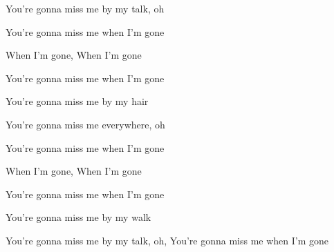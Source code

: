 You're gonna miss me by my talk, oh

You're gonna miss me when I'm gone

When I'm gone, When I'm gone

You're gonna miss me when I'm gone

You're gonna miss me by my hair

You're gonna miss me everywhere, oh

You're gonna miss me when I'm gone

When I'm gone, When I'm gone

You're gonna miss me when I'm gone

You're gonna miss me by my walk

You're gonna miss me by my talk, oh, You're gonna miss me when I'm gone

